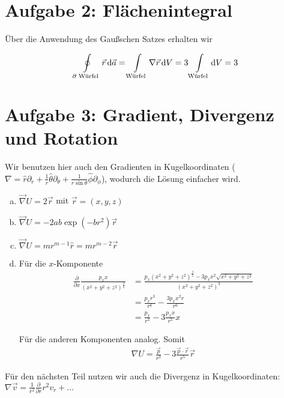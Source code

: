 \documentclass[a4paper,german,12pt,smallheadings]{scrartcl}
\begin{document}
\section*{Aufgabe 2: Flächenintegral}

Über die Anwendung des Gaußschen Satzes erhalten wir

\begin{equation}
  \oint\limits_\text{$\partial$ Würfel} \vec{r} \dif \vec{a} = \int\limits_\text{Würfel} \nabla \vec{r} \dif V = 3 \int\limits_\text{Würfel} \dif V = 3
\end{equation}

\section*{Aufgabe 3: Gradient, Divergenz und Rotation}

Wir benutzen hier auch den Gradienten in Kugelkoordinaten ($\nabla = \hat{r}
\partial_r + \frac{1}{r} \hat{\theta} \partial_\theta + \frac{1}{r \sin \theta}
\hat{\phi} \partial_\phi$), wodurch die Lösung einfacher wird.

\begin{enumerate}[a)]
  \item $\vec{\nabla} U = 2 \vec{r}$ mit $\vec{r} = (x,y,z)$
  \item $\vec{\nabla} U = -2ab \exp(-br^2) \vec{r}$
  \item $\vec{\nabla} U = mr^{m-1} \hat{r} = mr^{m-2} \vec{r}$
  \item
    Für die $x$-Komponente
    \begin{align}
      \frac{\partial}{\partial x} \frac{p_x x}{(x^2+y^2+z^2)^\frac{3}{2}}
      &= \frac{p_x(x^2+y^2+z^2)^\frac{3}{2} - 3p_xx^2\sqrt{x^2+y^2+z^2}}{(x^2+y^2+z^2)^3} \\
      &= \frac{p_x r^3}{r^6} - \frac{3p_x x^2 r}{r^6} \\
      &= \frac{p_x}{r^3} - 3 \frac{p_x x}{r^5} x
    \end{align}

    Für die anderen Komponenten analog. Somit
    \begin{align}
      \nabla U = \frac{\vec{p}}{r^3} - 3 \frac{\vec{p} \cdot \vec{r}}{r^5} \vec{r}
    \end{align}
\end{enumerate}


Für den nächsten Teil nutzen wir auch die Divergenz in Kugelkoordinaten:
$\nabla \vec{v} = \frac{1}{r^2} \frac{\partial}{\partial r} r^2 v_r + \dots$
\end{document}
